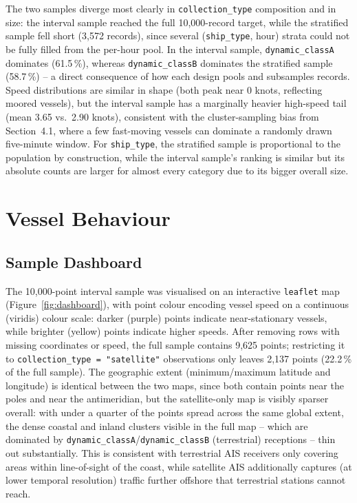 \documentclass[11pt,a4paper]{article}
\begin{document}
The two samples diverge most clearly in \texttt{collection\_type} composition
and in size: the interval sample reached the full 10{,}000-record target,
while the stratified sample fell short (3{,}572 records), since several
(\texttt{ship\_type}, hour) strata could not be fully filled from the
per-hour pool. In the interval sample, \texttt{dynamic\_classA} dominates
(61.5\,\%), whereas \texttt{dynamic\_classB} dominates the stratified sample
(58.7\,\%) -- a direct consequence of how each design pools and subsamples
records. Speed distributions are similar in shape (both peak near 0 knots,
reflecting moored vessels), but the interval sample has a marginally heavier
high-speed tail (mean 3.65 vs.\ 2.90 knots), consistent with the
cluster-sampling bias from Section~4.1, where a few fast-moving vessels can
dominate a randomly drawn five-minute window. For \texttt{ship\_type}, the
stratified sample is proportional to the population by construction, while
the interval sample's ranking is similar but its absolute counts are larger
for almost every category due to its bigger overall size.

\section{Vessel Behaviour}
\label{sec:behaviour}

\subsection{Sample Dashboard}

The 10{,}000-point interval sample was visualised on an interactive
\texttt{leaflet} map (Figure~\ref{fig:dashboard}), with point colour encoding
vessel speed on a continuous (viridis) colour scale: darker (purple) points
indicate near-stationary vessels, while brighter (yellow) points indicate higher
speeds. After removing rows with missing coordinates or speed, the full sample
contains 9{,}625 points; restricting it to \texttt{collection\_type =
"satellite"} observations only leaves 2{,}137 points (22.2\,\% of the full
sample). The geographic extent (minimum/maximum latitude and longitude) is
identical between the two maps, since both contain points near the poles and
near the antimeridian, but the satellite-only map is visibly sparser overall:
with under a quarter of the points spread across the same global extent, the
dense coastal and inland clusters visible in the full map -- which are
dominated by \texttt{dynamic\_classA}/\texttt{dynamic\_classB} (terrestrial)
receptions -- thin out substantially. This is consistent with terrestrial AIS
receivers only covering areas within line-of-sight of the coast, while
satellite AIS additionally captures (at lower temporal resolution) traffic
further offshore that terrestrial stations cannot reach.
\end{document}
